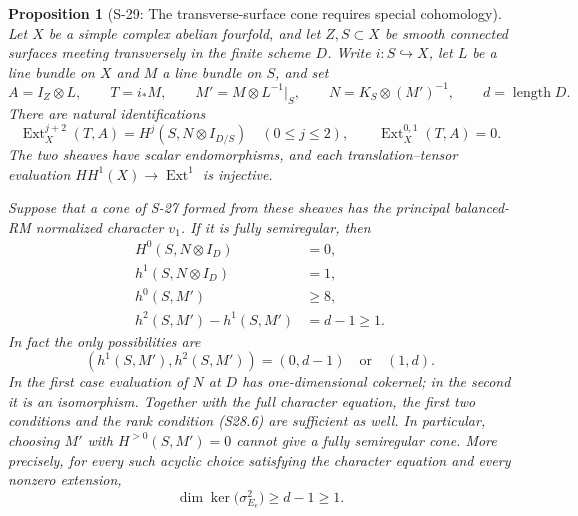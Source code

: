 \documentclass[11pt,a4paper]{article}
\newtheorem{proposition}[theorem]{Proposition}
\theoremstyle{definition}
\begin{document}
\begin{proposition}[S-29: The transverse-surface cone requires special cohomology]
\label{prop:semireg-surface-cone-cohomology}
Let $X$ be a simple complex abelian fourfold, and let
$Z,S\subset X$ be smooth connected surfaces meeting
transversely in the finite scheme $D$. Write $i:S\hookrightarrow X$,
let $L$ be a line bundle on $X$ and $M$ a line bundle on $S$,
and set
\[
 A=I_Z\otimes L,\qquad T=i_*M,\qquad
 M'=M\otimes L^{-1}|_S,\qquad
 N=K_S\otimes(M')^{-1},\qquad d=\operatorname{length}D.
\]
There are natural identifications
\[
 \operatorname{Ext}^{j+2}_X(T,A)=H^j(S,N\otimes I_{D/S})
       \quad(0\le j\le2),
 \qquad
 \operatorname{Ext}^{0,1}_X(T,A)=0.
 \tag{S29.1}
\]
The two sheaves have scalar endomorphisms, and each
translation--tensor evaluation $HH^1(X)\to\operatorname{Ext}^1$
is injective.

Suppose that a cone of S-27 formed from these sheaves has
the principal balanced-RM normalized character $v_1$.
If it is fully semiregular, then
\[
 \begin{split}
 H^0(S,N\otimes I_D)&=0,\\
 h^1(S,N\otimes I_D)&=1,\\
 h^0(S,M')&\ge8,\\
 h^2(S,M')-h^1(S,M')&=d-1\ge1.
 \end{split}
 \tag{S29.2}
\]
In fact the only possibilities are
\[
 (h^1(S,M'),h^2(S,M'))=(0,d-1)\quad\text{or}\quad(1,d).
 \tag{S29.2a}
\]
In the first case evaluation of $N$ at $D$ has
one-dimensional cokernel; in the second it is an
isomorphism. Together with the full character equation, the first two
conditions and the rank condition (S28.6) are sufficient
as well. In particular, choosing $M'$ with
$H^{>0}(S,M')=0$ cannot give a fully semiregular cone.
More precisely, for every such acyclic choice satisfying
the character equation and every nonzero extension,
\[
 \dim\ker\bigl(\sigma^2_{E_e}\bigr)\ge d-1\ge1.
 \tag{S29.3}
\]
\end{proposition}
\end{document}
